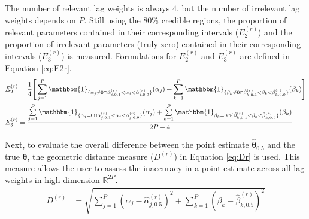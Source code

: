 The number of relevant lag weights is always $4$, but the number of irrelevant lag weights depends on $P$. Still using the $80\%$ credible regions, the proportion of relevant parameters contained in their corresponding intervals ($E_2^{(r)}$) and the proportion of irrelevant parameters (truly zero) contained in their corresponding intervals ($E_3^{(r)}$) is measured. Formulations for $E_2^{(r)}$ and $E_3^{(r)}$ are defined in Equation \ref{eq:E2r}. 
\begin{equation}
\label{eq:E2r}
	\begin{split}
	E^{(r)}_2&=\frac{1}{4}\Bigg[\sum\limits_{j=1}^P \mathbbm{1}_{\{\alpha_j\neq 0 \cap \hat{\alpha}^{(r)}_{j,0.1}<\alpha_j<\hat{\alpha}^{(r)}_{j,0.9}  \}} (\alpha_j) + \sum\limits_{k=1}^P \mathbbm{1}_{\{ \beta_k\neq 0 \cap \hat{\beta}^{(r)}_{k,0.1}<\beta_k<\hat{\beta}^{(r)}_{k,0.9}  \}} (\beta_k)\Bigg]\\
	E^{(r)}_3&=\frac{\sum\limits_{j=1}^P \mathbbm{1}_{\{\alpha_j= 0 \cap \hat{\alpha}^{(r)}_{j,0.1}<\alpha_j<\hat{\alpha}^{(r)}_{j,0.9}  \}} (\alpha_j) + \sum\limits_{k=1}^P \mathbbm{1}_{\beta_k= 0 \cap\{ \hat{\beta}^{(r)}_{k,0.1}<\beta_k<\hat{\beta}^{(r)}_{k,0.9}  \}} (\beta_k)}{2P-4}\\
	\end{split}
\end{equation}

Next, to evaluate the overall difference between the point estimate $\hat{\bm{\theta}}_{0.5}$ and the true $\bm{\theta}$, the geometric distance measure ($D^{(r)}$) in Equation \ref{eq:Dr} is used. This measure allows the user to assess the inaccuracy in a point estimate across all lag weights in high dimension $\mathbb{R}^{2P}$. 
\begin{equation}
\label{eq:Dr}
	\begin{split}
	D^{(r)}&=\sqrt{\sum\limits_{j=1}^P (\alpha_j-\hat{\alpha}^{(r)}_{j,0.5})^2+\sum\limits_{k=1}^P (\beta_k-\hat{\beta}^{(r)}_{k,0.5})^2}\\
	\end{split}
\end{equation}

